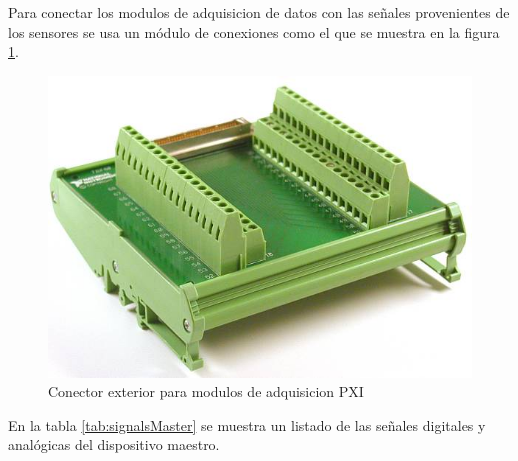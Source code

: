 Para conectar los modulos de adquisicion de datos con las señales provenientes de los sensores se usa un m\'odulo de conexiones como el que se muestra en la figura \ref{fig:conexionPXI}.



\begin{figure}[htb!]
\centering
\includegraphics[scale=0.15]{FiguresP/NI-TBX-68}
\caption{Conector exterior para modulos de adquisicion PXI}
\label{fig:conexionPXI}
\end{figure}


En la tabla \ref{tab:signalsMaster} se muestra un listado de las señales digitales y analógicas del dispositivo maestro.

